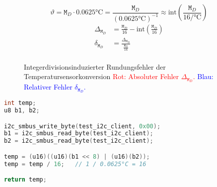 \begin{equation}
    \vartheta = \texttt{M}_D \cdot 0.0625\si{\celsius} = \frac{\texttt{M}_D}{\left(0.0625\si{\celsius}\right)^{-1}} \approx \text{int}\left(\frac{\texttt{M}_D}{16\si{\per\celsius}}\right)
    \label{eq:temp-convert}
\end{equation}
\begin{equation}
    \begin{aligned}
        \Delta_{\texttt{M}_D} &= \frac{\texttt{M}_D}{16} - \text{int}\left(\frac{\texttt{M}_D}{16}\right) \\[2ex]
        \delta_{\texttt{M}_D} &= \frac{\Delta_{\texttt{M}_D}}{\frac{\texttt{M}_D}{16} } \\[2ex]
    \end{aligned}
    \label{eq:temp-error}
\end{equation}
\begin{figure}
    \centering
    \caption[Integerdivisionsinduzierter Rundungsfehler]{Integerdivisionsinduzierter Rundungsfehler der Temperatursensorkonversion
    \textcolor{red}{Rot: Absoluter Fehler $\Delta_{\texttt{M}_D}$.}
    \textcolor{blue}{Blau: Relativer Fehler $\delta_{\texttt{M}_D}$.}
    }
    \label{fig:rounding-err}
\end{figure}
\begin{lstlisting}[language=C, firstnumber=39]
int temp;
u8 b1, b2;

i2c_smbus_write_byte(test_i2c_client, 0x00);
b1 = i2c_smbus_read_byte(test_i2c_client);
b2 = i2c_smbus_read_byte(test_i2c_client);

temp = (u16)((u16)(b1 << 8) | (u16)(b2));
temp = temp / 16;	// 1 / 0.0625°C = 16

return temp;
\end{lstlisting}

